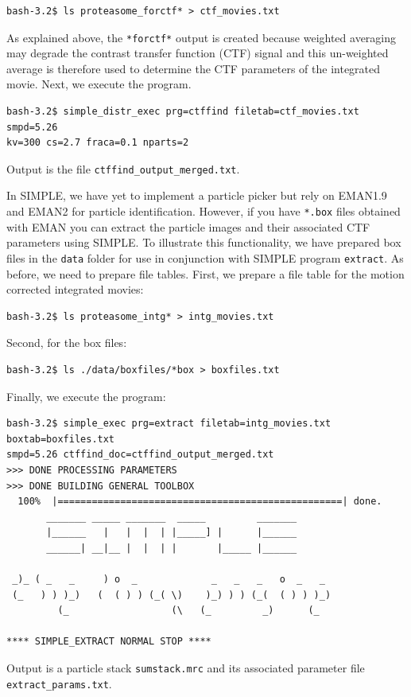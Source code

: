 \documentclass[a4paper,11pt]{article}
\newcommand{\prgname}[1]{\textcolor{NavyBlue}{\texttt{#1}}}
\begin{document}
\begin{verbatim}
bash-3.2$ ls proteasome_forctf* > ctf_movies.txt
\end{verbatim}
As explained above, the \texttt{*forctf*} output is created because weighted averaging may degrade the contrast transfer function (CTF) signal and this un-weighted average is therefore used to determine the CTF parameters of the integrated movie. Next, we execute the program.
\begin{verbatim}
bash-3.2$ simple_distr_exec prg=ctffind filetab=ctf_movies.txt smpd=5.26
kv=300 cs=2.7 fraca=0.1 nparts=2
\end{verbatim}
Output is the file \texttt{ctffind\_output\_merged.txt}.

In SIMPLE, we have yet to implement a particle picker but rely on EMAN1.9 and EMAN2 for particle identification. However, if you have \texttt{*.box} files obtained with EMAN you can extract the particle images and their associated CTF parameters using SIMPLE. To illustrate this functionality, we have prepared box files in the \texttt{data} folder for use in conjunction with SIMPLE program \prgname{extract}. As before, we need to prepare file tables. First, we prepare a file table for the motion corrected integrated movies:
\begin{verbatim}
bash-3.2$ ls proteasome_intg* > intg_movies.txt
\end{verbatim}
Second, for the box files:
\begin{verbatim}
bash-3.2$ ls ./data/boxfiles/*box > boxfiles.txt
\end{verbatim}
Finally, we execute the program:
\begin{verbatim}
bash-3.2$ simple_exec prg=extract filetab=intg_movies.txt boxtab=boxfiles.txt
smpd=5.26 ctffind_doc=ctffind_output_merged.txt 
>>> DONE PROCESSING PARAMETERS
>>> DONE BUILDING GENERAL TOOLBOX
  100%  |==================================================| done.
       _______ _____ _______  _____         _______
       |______   |   |  |  | |_____] |      |______
       ______| __|__ |  |  | |       |_____ |______
 
 _)_ ( _   _     ) o  _             _   _   _   o  _   _
 (_   ) ) )_)   (  ( ) ) (_( \)    )_) ) ) (_(  ( ) ) )_)
         (_                  (\   (_         _)      (_

**** SIMPLE_EXTRACT NORMAL STOP ****
\end{verbatim}
Output is a particle stack \texttt{sumstack.mrc} and its associated parameter file \texttt{extract\_params.txt}.
\end{document}
